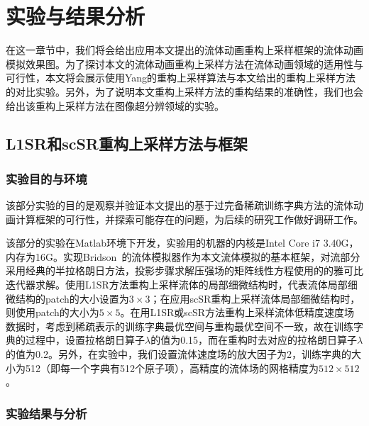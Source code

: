 
\chapter{实验与结果分析}
\label{chap:experiment}

在这一章节中，我们将会给出应用本文提出的流体动画重构上采样框架的流体动画模拟效果图。为了探讨本文的流体动画重构上采样方法在流体动画领域的适用性与可行性，本文将会展示使用Yang的重构上采样算法与本文给出的重构上采样方法的对比实验。另外，为了说明本文重构上采样方法的重构结果的准确性，我们也会给出该重构上采样方法在图像超分辨领域的实验。

\section{L1SR和scSR重构上采样方法与框架}

\subsection{实验目的与环境}

该部分实验的目的是观察并验证本文提出的基于过完备稀疏训练字典方法的流体动画计算框架的可行性，并探索可能存在的问题，为后续的研究工作做好调研工作。

该部分的实验在Matlab环境下开发，实验用的机器的内核是Intel Core i7 3.40G，内存为16G。实现Bridson~\cite{bridson2007fluid}的流体模拟器作为本文流体模拟的基本框架，对流部分采用经典的半拉格朗日方法，投影步骤求解压强场的矩阵线性方程使用的的雅可比迭代器求解。使用L1SR方法重构上采样流体的局部细微结构时，代表流体局部细微结构的patch的大小设置为$3\times3$；在应用scSR重构上采样流体局部细微结构时，则使用patch的大小为$5\times5$。在用L1SR或scSR方法重构上采样流体低精度速度场数据时，考虑到稀疏表示的训练字典最优空间与重构最优空间不一致，故在训练字典的过程中，设置拉格朗日算子$\lambda$的值为0.15，而在重构时去对应的拉格朗日算子$\lambda$的值为0.2。另外，在实验中，我们设置流体速度场的放大因子为2，训练字典的大小为512（即每一个字典有512个原子项），高精度的流体场的网格精度为$512\times512$。

\subsection{实验结果与分析}

